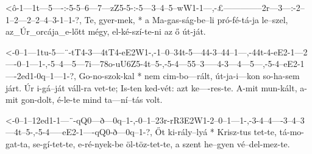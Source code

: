 


  {<ô-1---1t---5----:-5-5--6---7---zZ5-5-:-5---3--4--5--wW1-1---,-£--------------2r---3---:-2--1--2---2--2--4--3-1--1-?,}
  {   Te, gyer-mek, * a Ma-gas-ság-be--li  pró-fé-tá-ja le--szel, az_Úr_orcája_e-lőtt mégy, el-ké-szí-te-ni az ő út-ját.}



  {<-0--1---1tu-5---¨-tT4-3---4tT4-eE2W1-,-1--0--34t-5---44-3--44--1---,-44t-4-eE2-1---2----0--1---1-,-5--4---5---7i---78o-uU6Z5-4t--5-,-5-4---55--3-----4-3---4---5---,-5-4--eE2-1----2ed1-0q--1---1-?,}
  {  Go-no-szok-kal * nem cim-bo---rált,   út-ja-i---kon so-ha-sem járt. Úr  i-gá--ját váll-ra vet-te; Is-ten ked-vét: azt ke----res-te. A-mit mun-kált, a-mit gon-dolt, é-le-te  mind ta---ní--tás volt.}

  {<-0--1--12ed1-1---¨-qQ0---ð---0q--1-,-0--1--23r-rR3E2W1-2--0--1---1-,-3-4--4----3--4--3---4t--5-,-5-4-----eE2-1----qQ0-ð---0q--1-?,}
  {  Őt ki-rály--lyá * Krisz-tus tet-te, tá-mo-gat-ta,     se-gí-tet-te, e-ré-nyek-be öl-töz-tet-te, a szent he--gyen vé--del-mez-te.}




